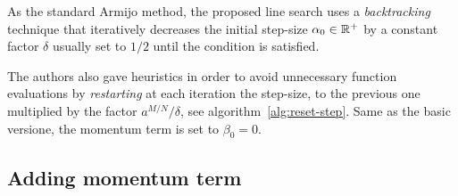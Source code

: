 
As the standard Armijo method, the proposed line search uses a \emph{backtracking} technique that iteratively decreases the initial step-size $\alpha_0\in\mathbb{R}^+$ by a constant factor $\delta$ usually set to $1/2$ until the condition is satisfied.

The authors also gave heuristics in order to avoid unnecessary function evaluations by \emph{restarting} at each iteration the step-size, to the previous one multiplied by the factor $a^{M/N}/\delta$, see algorithm~\vref{alg:reset-step}. Same as the basic versione, the momentum term is set to $\beta_0=0$.%

\subsection{Adding momentum term}\label{subsc:sgdm}

